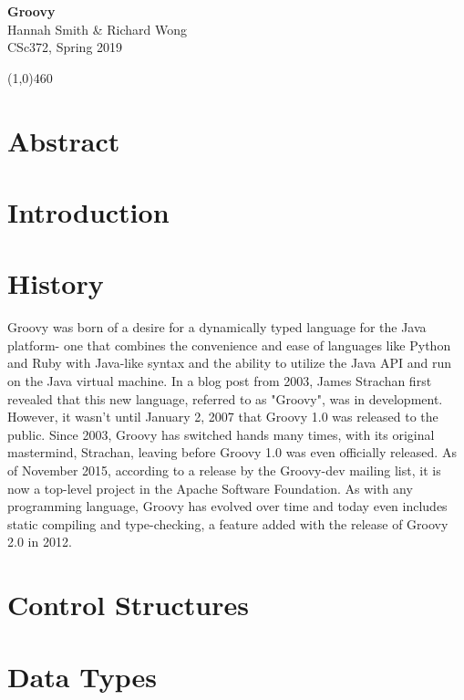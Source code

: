 \documentclass[12pt]{article}
\begin{document}
\begin{center}
    {\bf \large\fontsize{15}{15} \selectfont Groovy} \\
    {Hannah Smith \& Richard Wong} \\
    {CSc372, Spring 2019}\\
\end{center}

\begin{center}
\line(1,0){460}
\end{center}

\section*{\fontsize{14}{15}\selectfont Abstract}


\section*{\fontsize{14}{15}\selectfont Introduction}


\section*{\fontsize{14}{15}\selectfont History}
Groovy was born of a desire for a dynamically typed language for the Java platform- one that combines the convenience and ease of languages like Python and Ruby with Java-like syntax and the ability to utilize the Java API and run on the Java virtual machine. In a blog post from 2003, James Strachan first revealed that this new language, referred to as "Groovy", was in development. However, it wasn't until January 2, 2007 that Groovy 1.0 was released to the public. Since 2003, Groovy has switched hands many times, with its original mastermind, Strachan, leaving before Groovy 1.0 was even officially released. As of November 2015, according to a release by the Groovy-dev mailing list, it is now a top-level project in the Apache Software Foundation. As with any programming language, Groovy has evolved over time and today even includes static compiling and type-checking, a feature added with the release of Groovy 2.0 in 2012.

\section*{\fontsize{14}{15}\selectfont Control Structures}

\section*{\fontsize{14}{15}\selectfont Data Types}
\end{document}

